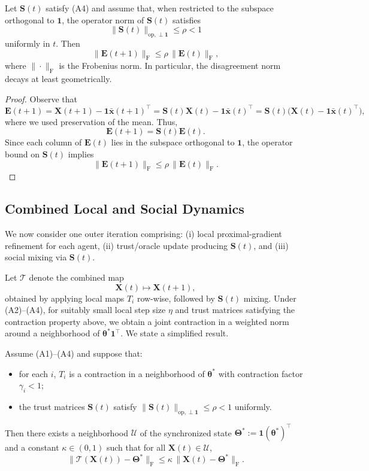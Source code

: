 \documentclass[11pt]{article}
\begin{document}
\begin{proposition}
Let $\bm{S}(t)$ satisfy (A4) and assume that, when restricted to the
subspace orthogonal to $\bm{1}$, the operator norm of $\bm{S}(t)$
satisfies
\[
  \bigl\|\bm{S}(t)\bigr\|_{\mathrm{op},\perp \bm{1}}
  \leq \rho < 1
\]
uniformly in $t$.
Then
\[
  \|\bm{E}(t+1)\|_{\mathrm{F}}
  \leq
  \rho \, \|\bm{E}(t)\|_{\mathrm{F}},
\]
where $\|\cdot\|_{\mathrm{F}}$ is the Frobenius norm.
In particular, the disagreement norm decays at least geometrically.
\end{proposition}

\begin{proof}
Observe that
\[
  \bm{E}(t+1)
  = \bm{X}(t+1) - \bm{1}\bar{\bm{x}}(t+1)^\top
  = \bm{S}(t)\bm{X}(t) - \bm{1}\bar{\bm{x}}(t)^\top
  = \bm{S}(t)\bigl(\bm{X}(t) - \bm{1}\bar{\bm{x}}(t)^\top\bigr),
\]
where we used preservation of the mean.
Thus,
\[
  \bm{E}(t+1)
  = \bm{S}(t) \bm{E}(t).
\]
Since each column of $\bm{E}(t)$ lies in the subspace orthogonal to
$\bm{1}$, the operator bound on $\bm{S}(t)$ implies
\[
  \|\bm{E}(t+1)\|_{\mathrm{F}}
  \leq
  \rho \, \|\bm{E}(t)\|_{\mathrm{F}}.
\]
\end{proof}

\subsection{Combined Local and Social Dynamics}

We now consider one outer iteration comprising:
(i) local proximal-gradient refinement for each agent,
(ii) trust/oracle update producing $\bm{S}(t)$,
and (iii) social mixing via $\bm{S}(t)$.

Let $\mathcal{T}$ denote the combined map
\[
  \bm{X}(t) \mapsto \bm{X}(t+1),
\]
obtained by applying local maps $T_i$ row-wise, followed by $\bm{S}(t)$
mixing.
Under (A2)–(A4), for suitably small local step size $\eta$ and
trust matrices satisfying the contraction property above, we obtain a
joint contraction in a weighted norm around a neighborhood of
$\bm{\theta}^* \bm{1}^\top$.
We state a simplified result.

\begin{proposition}
Assume (A1)–(A4) and suppose that:
\begin{itemize}[noitemsep]
  \item for each $i$, $T_i$ is a contraction in a neighborhood of
        $\bm{\theta}^*$ with contraction factor $\gamma_i < 1$;
  \item the trust matrices $\bm{S}(t)$ satisfy
        $\|\bm{S}(t)\|_{\mathrm{op},\perp \bm{1}} \leq \rho < 1$
        uniformly.
\end{itemize}
Then there exists a neighborhood $\mathcal{U}$ of the synchronized
state
$\bm{\Theta}^* := \bm{1} (\bm{\theta}^*)^\top$
and a constant $\kappa \in (0,1)$ such that for all
$\bm{X}(t) \in \mathcal{U}$,
\[
  \|\mathcal{T}(\bm{X}(t)) - \bm{\Theta}^*\|_{\mathrm{F}}
  \leq
  \kappa \, \|\bm{X}(t) - \bm{\Theta}^*\|_{\mathrm{F}}.
\]
\end{proposition}
\end{document}
